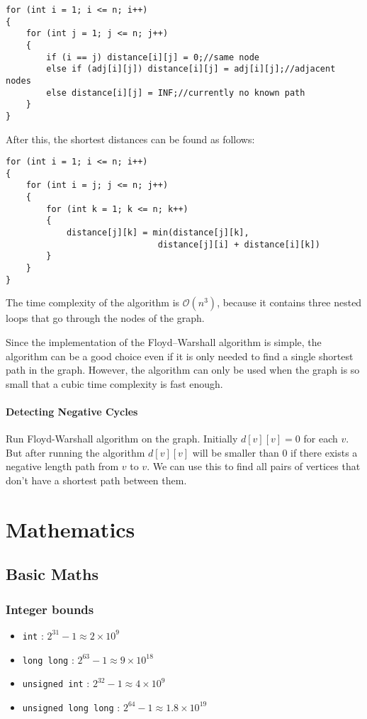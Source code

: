 \documentclass[twoside,12pt,a4paper,english]{book}
\theoremstyle{definition}
\theoremstyle{problemstyle}
\theoremstyle{problemstyle}
\theoremstyle{problemstyle}
\begin{document}
\begin{lstlisting}
for (int i = 1; i <= n; i++) 
{
    for (int j = 1; j <= n; j++) 
    {
        if (i == j) distance[i][j] = 0;//same node
        else if (adj[i][j]) distance[i][j] = adj[i][j];//adjacent nodes
        else distance[i][j] = INF;//currently no known path
    }
}
\end{lstlisting}
After this, the shortest distances can be found as follows:
\begin{lstlisting}
for (int i = 1; i <= n; i++) 
{
    for (int i = j; j <= n; j++) 
    {
        for (int k = 1; k <= n; k++) 
        {
            distance[j][k] = min(distance[j][k], 
                              distance[j][i] + distance[i][k])
        }
    }
}
\end{lstlisting}

The time complexity of the algorithm is $\mathcal{O}(n^3)$,
because it contains three nested loops
that go through the nodes of the graph.

Since the implementation of the Floyd–Warshall
algorithm is simple, the algorithm can be
a good choice even if it is only needed to find a
single shortest path in the graph.
However, the algorithm can only be used when the graph
is so small that a cubic time complexity is fast enough.

\subsection{Detecting Negative Cycles}

Run Floyd-Warshall algorithm on the graph. Initially $d[v][v]=0$ for each $v$. But after running the algorithm $d[v][v]$ will be smaller than $0$ if there exists a negative length path from $v$ to $v$. We can use this to find all pairs of vertices that don't have a shortest path between them.

\part{Mathematics}
\chapter{Basic Maths}

\section{Integer bounds}

\begin{itemize}
    \item\texttt{int} :  $2^{31} - 1 \approx 2\times10^9$
    \item\texttt{long long} :  $2^{63} - 1 \approx 9\times10^{18}$
    \item\texttt{unsigned int} :  $2^{32} - 1 \approx 4\times10^9$
    \item\texttt{unsigned long long} :  $2^{64} - 1 \approx 1.8\times10^{19}$
\end{itemize}
\end{document}
